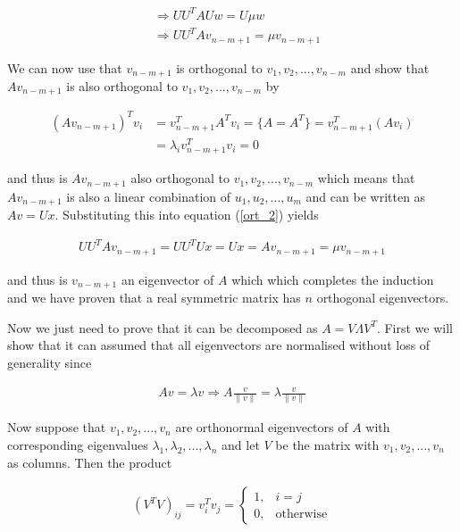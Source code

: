 \begin{align}
  & \Rightarrow U U^T A Uw = U \mu w \\
  & \Rightarrow U U^T A v_{n-m+1} = \mu v_{n-m+1}
  \label{ort_2}
\end{align}

We can now use that $v_{n-m+1}$ is orthogonal to $v_1, v_2, ..., v_{n-m}$ and show that $Av_{n-m+1}$ is also orthogonal to $v_1, v_2, ..., v_{n-m}$ by

\begin{align}
  (Av_{n-m+1})^T v_i & = v_{n-m+1}^T A^T v_i =  \bigg \{ A = A^T \bigg \} = v_{n-m+1}^T (A v_i)\\
  & = \lambda_i v_{n-m+1}^T v_i = 0
\end{align}

and thus is $Av_{n-m+1}$ also orthogonal to $v_1, v_2, ..., v_{n-m}$ which means that $Av_{n-m+1}$ is also a linear combination of $u_1, u_2, ..., u_m$ and can be written as $Av = Ux$. Substituting this into equation (\ref{ort_2}) yields

\begin{align}
  U U^T A v_{n-m+1} = U U^T U x = Ux = Av_{n-m+1} = \mu v_{n-m+1}
\end{align}

and thus is $v_{n-m+1}$ an eigenvector of $A$ which which completes the induction and we have proven that a real symmetric matrix has $n$ orthogonal eigenvectors.

Now we just need to prove that it can be decomposed as $A = V \Lambda V^T$. First we will show that it can assumed that all eigenvectors are normalised without loss of generality since

\begin{align*}
  Av = \lambda v \Rightarrow A \frac{v}{\| v \|} = \lambda \frac{v}{\| v \|}
\end{align*}

Now suppose that $v_1, v_2, ..., v_{n}$ are orthonormal eigenvectors of $A$ with corresponding eigenvalues $\lambda_1, \lambda_2,..., \lambda_n$ and let $V$ be the matrix with $v_1, v_2, ..., v_{n}$ as columns. Then the product

\begin{align*}
  (V^TV)_{ij} = v_i^Tv_j =
  \begin{cases}
    1, & i = j\\
    0,              & \text{otherwise}
  \end{cases}
\end{align*}

